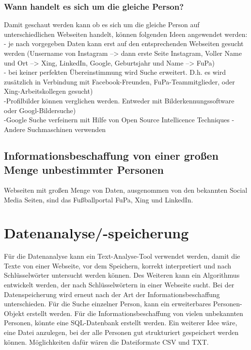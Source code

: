 		\subsubsection{Wann handelt es sich um die gleiche Person?}
		Damit geschaut werden kann ob es sich um die gleiche Person auf unterschiedlichen Webseiten handelt, können folgenden Ideen angewendet werden:\\
		- je nach vorgegeben Daten kann erst auf den entsprechenden Webseiten gesucht werden (Unsername von Instagram --> dann erste Seite Instagram, Voller Name und Ort --> Xing, LinkedIn, Google, Geburtsjahr und Name --> FuPa)\\
		- bei keiner perfekten Übereinstimmung wird Suche erweitert. D.h. es wird zusätzlich in Verbindung mit Facebook-Freunden, FuPa-Teammitglieder, oder Xing-Arbeitskollegen gesucht)\\
		-Profilbilder können verglichen werden. Entweder mit Bilderkennungssoftware oder Googl-Bildersuche)\\
		-Google Suche verfeinern mit Hilfe von Open Source Intellicence Techniques
		-Andere Suchmaschinen verwenden
		
	\subsection{Informationsbeschaffung von einer großen Menge unbestimmter Personen}
	Webseiten mit großen Menge von Daten, ausgenommen von den bekannten Social Media Seiten, sind das Fußballportal FuPa, Xing und LinkedIn.
	
\section{Datenanalyse/-speicherung}
Für die Datenanalyse kann ein Text-Analyse-Tool verwendet werden, damit die Texte von einer Webseite, vor dem Speichern, korrekt interpretiert und nach Schlüsselwörter untersucht werden können. Des Weiteren kann ein Algorithmus entwickelt werden, der nach Schlüsselwörtern in einer Webseite sucht.%
Bei der Datenspeicherung wird erneut nach der Art der Informationsbeschaffung unterschieden. Für die Suche einzelner Person, kann ein erweiterbares Personen-Objekt erstellt werden. Für die Informationsbeschaffung von vielen unbekannten Personen, könnte eine SQL-Datenbank erstellt werden. Ein weiterer Idee wäre, eine Datei anzulegen, bei der alle Personen gut strukturiert gespeichert werden können. Möglichkeiten dafür wären die Dateiformate CSV und TXT.%

